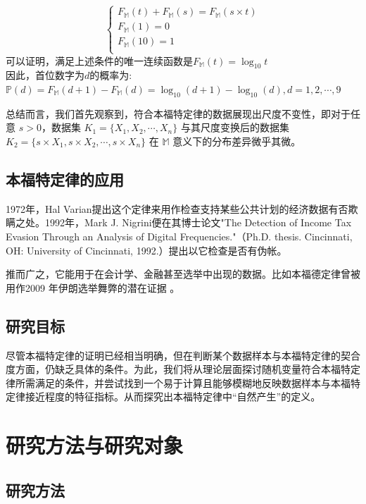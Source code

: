 \documentclass{ctexart} %
\begin{document}
\begin{enumerate}
\begin{equation}
\begin{cases}
                F_{\mathbb{M}}(t)+F_{\mathbb{M}}(s)=F_{\mathbb{M}}(s\times t)\\
                F_{\mathbb{M}}(1)=0\\
                F_{\mathbb{M}}(10)=1\\
            \end{cases}
        \end{equation}
        可以证明，满足上述条件的唯一连续函数是$F_{\mathbb{M}}(t)=\log_{10}t$\\
        因此，首位数字为$d$的概率为:\\
        $\mathbb{P}(d)=F_{\mathbb{M}}(d+1)-F_{\mathbb{M}}(d)=\log_{10}(d+1)-\log_{10}(d), d=1,2,\cdots,9$
\end{enumerate}
总结而言，我们首先观察到，符合本福特定律的数据展现出尺度不变性，即对于任意 $s > 0$，数据集 $K_1 = \{X_1, X_2, \cdots, X_n\}$ 与其尺度变换后的数据集 $K_2 = \{s \times X_1, s \times X_2, \cdots, s \times X_n\}$ 在 $\mathbb{M}$ 意义下的分布差异微乎其微。

\subsection{本福特定律的应用}
1972年，Hal Varian提出这个定律来用作检查支持某些公共计划的经济数据有否欺瞒之处。1992年，Mark J. Nigrini便在其博士论文"The Detection of Income Tax Evasion Through an Analysis of Digital Frequencies."（Ph.D. thesis. Cincinnati, OH: University of Cincinnati, 1992.）提出以它检查是否有伪帐。\cite{wiki_benford}

推而广之，它能用于在会计学、金融甚至选举中出现的数据。比如本福德定律曾被用作2009 年伊朗选举舞弊的潜在证据 。\cite{Iran}

\subsection{研究目标}

尽管本福特定律的证明已经相当明确，但在判断某个数据样本与本福特定律的契合度方面，仍缺乏具体的条件。为此，我们将从理论层面探讨随机变量符合本福特定律所需满足的条件，并尝试找到一个易于计算且能够模糊地反映数据样本与本福特定律接近程度的特征指标。从而探究出本福特定律中“自然产生”的定义。

\section{研究方法与研究对象}

\subsection{研究方法}
\end{document}
